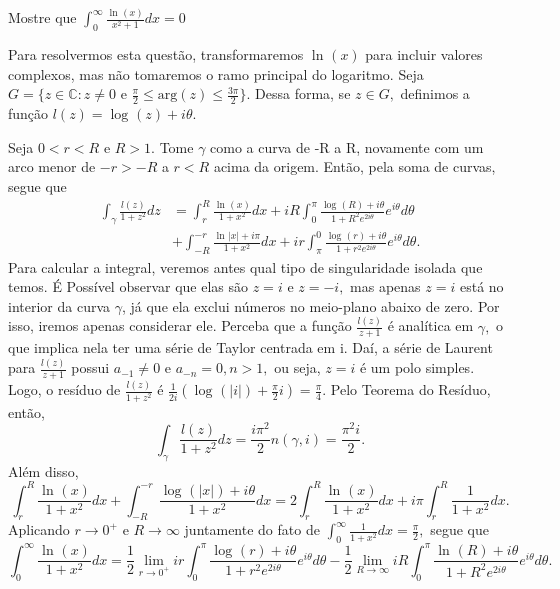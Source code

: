 \documentclass[ComplexAnalysis/complex.tex]{subfiles}
\begin{document}
\begin{exer*}
	Mostre que \(\int_{0}^{\infty}\frac{\ln^{}{(x)}}{x^{2}+1}dx = 0\)

	Para resolvermos esta questão, transformaremos \(\ln^{}{(x)}\) para incluir valores complexos, mas não tomaremos o ramo principal do logaritmo.
	Seja \(G = \{z\in \mathbb{C}: z\neq0\text{ e }\frac{\pi }{2}\leq \mathrm{arg}(z)\leq \frac{3\pi }{2}\}.\) Dessa forma, se \(z\in G,\) definimos a função
	\(l(z) = \log^{}{(z)} + i\theta .\)

	Seja \(0 < r < R\) e \(R > 1\). Tome \(\gamma \) como a curva de -R a R, novamente com um arco menor de \(-r > -R\) a \(r < R\) acima da origem. Então,
	pela soma de curvas, segue que
	\begin{align*}
		\int_{\gamma }^{}\frac{l(z)}{1 + z^{2}}dz & = \int_{r}^{R}\frac{\ln^{}{(x)}}{1 + x^{2}}dx + iR \int_{0}^{\pi }\frac{\log^{}{(R)}+i\theta }{1 + R^{2}e^{2i\theta }}e^{i\theta }d\theta            \\
		                                          & + \int_{-R}^{-r}\frac{\ln^{}{|x|}+i\pi }{1 + x^{2}}dx + ir \int_{\pi }^{0}\frac{\log^{}{(r)} + i\theta }{1 + r^{2}e^{2i\theta }}e^{i\theta }d\theta.
	\end{align*}
	Para calcular a integral, veremos antes qual tipo de singularidade isolada que temos. É Possível observar que elas são
	\(z=i\) e \(z=-i,\) mas apenas \(z=i\) está no interior da curva \(\gamma \), já que ela exclui números no meio-plano abaixo de zero. Por isso,
	iremos apenas considerar ele. Perceba que a função \(\frac{l(z)}{z+1}\) é analítica em \(\gamma ,\) o que implica nela ter uma série de Taylor
	centrada em i. Daí, a série de Laurent para \(\frac{l(z)}{z+1}\) possui \(a_{-1}\neq0\) e \(a_{-n} = 0, n > 1,\) ou seja,
	\(z=i\) é um polo simples. Logo, o resíduo de \(\frac{l(z)}{1+z^{2}}\) é \(\frac{1}{2i}(\log^{}{(|i|)} + \frac{\pi }{2}i) = \frac{\pi }{4}.\)
	Pelo Teorema do Resíduo, então,
	\[
		\int_{\gamma }^{}\frac{l(z)}{1+z^{2}}dz = \frac{i\pi ^{2}}{2}n(\gamma, i) = \frac{\pi^{2}i}{2}.
	\]
	Além disso,
	\[
		\int_{r}^{R}\frac{\ln^{}{(x)}}{1+x^{2}}dx + \int_{-R}^{-r}\frac{\log^{}{(|x|)} + i\theta }{1 + x^{2}}dx = 2 \int_{r}^{R}\frac{\ln^{}{(x)}}{1 + x^{2}}dx + i\pi \int_{r}^{R}\frac{1}{1+x^{2}}dx.
	\]
	Aplicando \(r\to 0^{+}\) e \(R\to \infty\) juntamente do fato de \(\int_{0}^{\infty}\frac{1}{1+x^{2}}dx = \frac{\pi }{2},\) segue que
	\[
		\int_{0}^{\infty}\frac{\ln^{}{(x)}}{1 + x^{2}}dx = \frac{1}{2}\lim_{r\to 0^{+}}ir \int_{0}^{\pi }\frac{\log^{}{(r)} + i\theta }{1 + r^{2}e^{2i\theta }}e^{i\theta }d\theta - \frac{1}{2}\lim_{R\to \infty}iR \int_{0}^{\pi }\frac{\ln^{}{(R)} + i\theta }{1 + R^{2}e^{2i\theta }}e^{i\theta }d\theta .
\]
\end{exer*}
\end{document}
